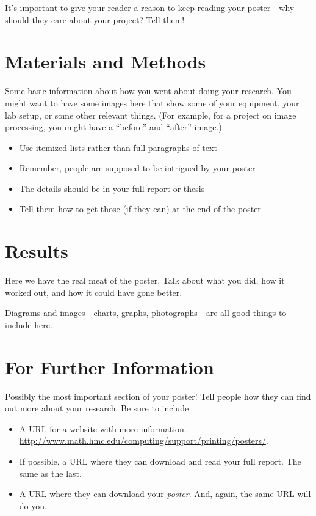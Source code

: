 \documentclass[thesis]{hmcposter}
\begin{document}
\begin{poster}
It's important to give your reader a reason to keep reading your
poster---why should they care about your project?  Tell them!


\section{Materials and Methods}%

Some basic information about how you went about doing your
research.  You might want to have some images here that show some of
your equipment, your lab setup, or some other relevant things.  (For
example, for a project on image processing, you might have a
``before'' and ``after'' image.)

\begin{itemize}
\item Use itemized lists rather than full paragraphs of text
\item Remember, people are supposed to be intrigued by your poster
\item The details should be in your full report or thesis
\item Tell them how to get those (if they can) at the end of the poster
\end{itemize}


\section{Results}%

Here we have the real meat of the poster.  Talk about what you did,
how it worked out, and how it could have gone better.

Diagrams and images---charts, graphs, photographs---are all good
things to include here.


\section{For Further Information}

Possibly the most important section of your poster!  Tell people
how they can find out more about your research.  Be sure to
include
\begin{itemize}
\item A URL for a website with more information.  \url{http://www.math.hmc.edu/computing/support/printing/posters/}.
\item If possible, a URL where they can download and read your full
  report.  The same as the last.
\item A URL where they can download your \emph{poster}.  And, again,
  the same URL will do you.
\end{itemize}




\end{poster}
\end{document}
